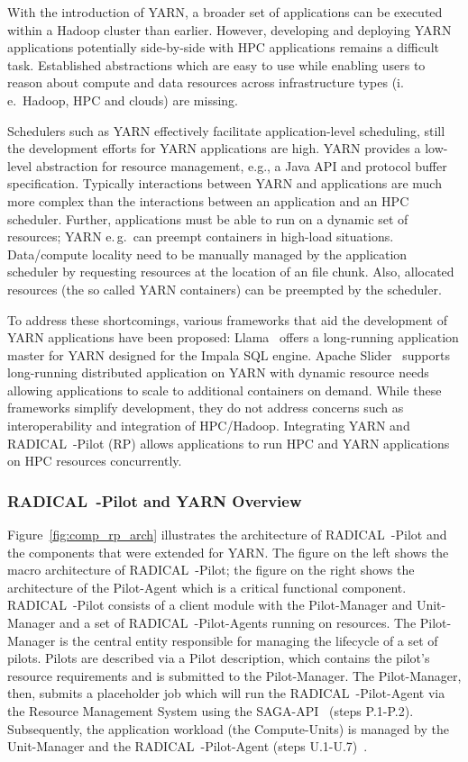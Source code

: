 With the introduction of YARN, a broader set of applications can be executed within a Hadoop cluster than earlier.
However, developing and deploying YARN applications potentially side-by-side with HPC applications remains a difficult task.
Established abstractions which are easy to use while enabling users to reason about compute and data resources across infrastructure types (i.\,e.\ Hadoop, HPC and clouds) are missing. 

Schedulers such as YARN effectively facilitate application-level scheduling, still the development efforts for YARN applications are high.
YARN provides a low-level abstraction for resource management, e.g., a Java API and protocol buffer specification.
Typically interactions between YARN and applications are much more complex than the interactions between an application and an HPC scheduler.
Further, applications must be able to run on a dynamic set of resources; YARN e.\,g.\ can preempt containers in high-load situations.
Data/compute locality need to be manually managed by the application scheduler by requesting resources at the location of an file chunk.
Also, allocated resources (the so called YARN containers) can be preempted by the scheduler.

To address these shortcomings, various frameworks that aid the development of YARN applications have been proposed: Llama~\cite{llama} offers a long-running application master for YARN designed for the Impala SQL engine.
Apache Slider~\cite{apache-slider} supports long-running distributed application on YARN with dynamic resource needs allowing applications to scale to additional containers on demand.
While these frameworks simplify development, they do not address concerns such as interoperability and integration of HPC/Hadoop.
Integrating YARN and RADICAL~-Pilot (RP) allows applications to run HPC and YARN applications on HPC resources concurrently.

\subsubsection*{RADICAL~-Pilot and YARN Overview}
\label{sssec:rp_yarn}
Figure~\ref{fig:comp_rp_arch} illustrates the architecture of RADICAL~-Pilot and the components that were extended for YARN.
The figure on the left shows the macro architecture of RADICAL~-Pilot; the figure on the right shows the architecture of the Pilot-Agent which is a critical functional component.
RADICAL~-Pilot consists of a client module with the Pilot-Manager and Unit-Manager and a set of RADICAL~-Pilot-Agents running on resources.
The Pilot-Manager is the central entity responsible for managing the lifecycle of a set of pilots.
Pilots are described via a Pilot description, which contains the pilot's resource requirements and is submitted to the Pilot-Manager.
The Pilot-Manager, then, submits a placeholder job which will run the RADICAL~-Pilot-Agent via the Resource Management System using the SAGA-API~\cite{merzky2015saga} (steps P.1-P.2).
Subsequently, the application workload (the Compute-Units) is managed by the Unit-Manager and the RADICAL~-Pilot-Agent (steps U.1-U.7)~\cite{merzky2019using}.

